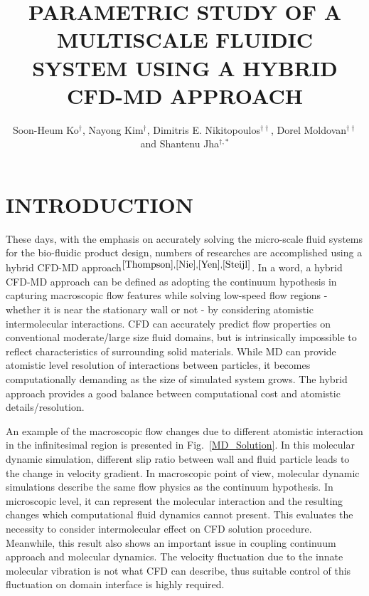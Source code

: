 \documentclass{CFD2010paper}
\title{PARAMETRIC STUDY OF A MULTISCALE FLUIDIC SYSTEM\newline
USING A HYBRID CFD-MD APPROACH}
\author{Soon-Heum Ko$^{\dag}$, Nayong Kim$^{\dag}$, Dimitris E. Nikitopoulos$^{\dag\dag}$, Dorel Moldovan$^{\dag\dag}$ and Shantenu Jha$^{{\dag},*}$}
\begin{document}



\newpage

\section{INTRODUCTION}
These days, with the emphasis on accurately solving the micro-scale fluid systems for the bio-fluidic product design, numbers of researches are accomplished using a hybrid CFD-MD approach$^{\cite{Thompson},\cite{Nie},\cite{Yen},\cite{Steijl}}$. In a word, a hybrid CFD-MD approach can be defined as adopting the continuum hypothesis in capturing macroscopic flow features while solving low-speed flow regions - whether it is near the stationary wall or not - by considering atomistic intermolecular interactions. CFD can accurately predict flow properties on conventional moderate/large size fluid domains, but is intrinsically impossible to reflect characteristics of surrounding solid materials. While MD can provide atomistic level resolution of interactions between particles, it becomes computationally demanding as the size of simulated system grows. The hybrid approach provides a good balance between computational cost and atomistic details/resolution.

An example of the macroscopic flow changes due to different atomistic interaction in the infinitesimal region is presented in Fig.~\ref{MD_Solution}. In this molecular dynamic simulation, different slip ratio between wall and fluid particle leads to the change in velocity gradient. In macroscopic point of view, molecular dynamic simulations describe the same flow physics as the continuum hypothesis. In microscopic level, it can represent the molecular interaction and the resulting changes which computational fluid dynamics cannot present. This evaluates the necessity to consider intermolecular effect on CFD solution procedure. Meanwhile, this result also shows an important issue in coupling continuum approach and molecular dynamics. The velocity fluctuation due to the innate molecular vibration is not what CFD can describe, thus suitable control of this fluctuation on domain interface is highly required.
\end{document}
